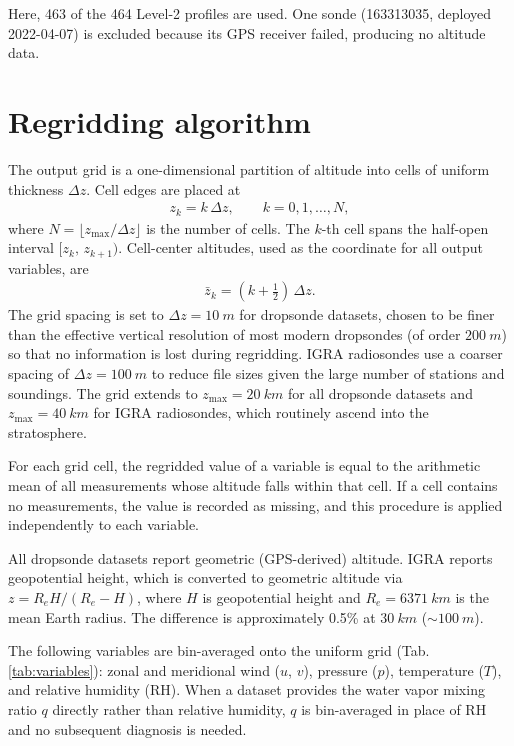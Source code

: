\documentclass[11pt]{article}
\begin{document}
Here, 463 of the 464 Level-2 profiles are used.  One sonde (163313035, deployed 2022-04-07) is excluded because its GPS receiver failed, producing no altitude data.

\section{Regridding algorithm}

The output grid is a one-dimensional partition of altitude into cells of uniform thickness $\Delta z$.  Cell edges are placed at
\begin{align}
    z_k = k\,\Delta z, \qquad k = 0, 1, \ldots, N, \label{eq:edges}
\end{align}
where $N = \lfloor z_{\max}/\Delta z\rfloor$ is the number of cells.  The $k$-th cell spans the half-open interval $[z_k,\, z_{k+1})$.  Cell-center altitudes, used as the coordinate for all output variables, are
\begin{align}
    \bar{z}_k = (k + \tfrac{1}{2})\,\Delta z. \label{eq:centers}
\end{align}
The grid spacing is set to $\Delta z = \SI{10}{m}$ for dropsonde datasets, chosen to be finer than the effective vertical resolution of most modern dropsondes (of order $\SI{200}{m}$) so that no information is lost during regridding.  IGRA radiosondes use a coarser spacing of $\Delta z = \SI{100}{m}$ to reduce file sizes given the large number of stations and soundings.  The grid extends to $z_{\max} = \SI{20}{km}$ for all dropsonde datasets and $z_{\max} = \SI{40}{km}$ for IGRA radiosondes, which routinely ascend into the stratosphere.

For each grid cell, the regridded value of a variable is equal to the arithmetic mean of all measurements whose altitude falls within that cell.  If a cell contains no measurements, the value is recorded as missing, and this procedure is applied independently to each variable.

All dropsonde datasets report geometric (GPS-derived) altitude.  IGRA reports geopotential height, which is converted to geometric altitude via $z = R_e H / (R_e - H)$, where $H$ is geopotential height and $R_e = \SI{6371}{km}$ is the mean Earth radius.  The difference is approximately 0.5\% at $\SI{30}{km}$ (${\sim}\SI{100}{m}$).

The following variables are bin-averaged onto the uniform grid (Tab. \ref{tab:variables}): zonal and meridional wind ($u$, $v$), pressure ($p$), temperature ($T$), and relative humidity ($\mathrm{RH}$).  When a dataset provides the water vapor mixing ratio $q$ directly rather than relative humidity, $q$ is bin-averaged in place of $\mathrm{RH}$ and no subsequent diagnosis is needed. 
\end{document}
